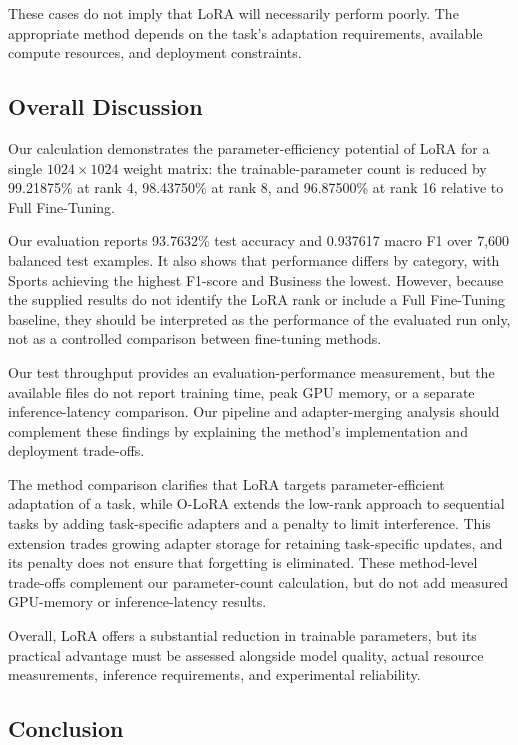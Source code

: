These cases do not imply that LoRA will necessarily perform
poorly. The appropriate method depends on the task's adaptation
requirements, available compute resources, and deployment
constraints.

\subsection{Overall Discussion}

Our calculation demonstrates the parameter-efficiency
potential of LoRA for a single $1024 \times 1024$ weight matrix:
the trainable-parameter count is reduced by 99.21875\% at
rank 4, 98.43750\% at rank 8, and 96.87500\% at rank 16
relative to Full Fine-Tuning.

Our evaluation reports 93.7632\% test accuracy and
0.937617 macro F1 over 7,600 balanced test examples. It also
shows that performance differs by category, with Sports
achieving the highest F1-score and Business the lowest.
However, because the supplied results do not identify the
LoRA rank or include a Full Fine-Tuning baseline, they should
be interpreted as the performance of the evaluated run only,
not as a controlled comparison between fine-tuning methods.

Our test throughput provides an evaluation-performance
measurement, but the available files do not report training
time, peak GPU memory, or a separate inference-latency
comparison. Our pipeline and adapter-merging analysis
should complement these findings by explaining the method's
implementation and deployment trade-offs.

The method comparison clarifies that LoRA targets parameter-efficient
adaptation of a task, while O-LoRA extends the low-rank approach to
sequential tasks by adding task-specific adapters and a penalty to
limit interference. This extension trades growing adapter storage
for retaining task-specific updates, and its penalty does not ensure
that forgetting is eliminated. These method-level trade-offs
complement our parameter-count calculation, but do not add measured
GPU-memory or inference-latency results.

Overall, LoRA offers a substantial reduction in trainable
parameters, but its practical advantage must be assessed
alongside model quality, actual resource measurements,
inference requirements, and experimental reliability.

\subsection{Conclusion}

